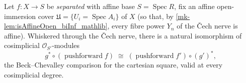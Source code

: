 \begin{lemma}\label{mk-lem:cech_pushforward_baseChange_natIso}
  \leanok

  Let \(f : X \to S\) be \emph{separated} with affine base \(S = \operatorname{Spec} R\),
  fix an affine open-immersion cover \(\mathfrak{U} = \{U_i = \operatorname{Spec} A_i\}\) of
  \(X\) (so that, by \ref{mk-lem:isAffineOpen_biInf_mathlib}, every fibre power \(Y_n\) of the
  {\v C}ech nerve is affine). Whiskered through the {\v C}ech nerve, there is a natural
  isomorphism of cosimplicial \(\mathcal{O}_{S'}\)-modules
  \[
    g^* \circ (\operatorname{pushforward} f) \;\cong\;
      (\operatorname{pushforward} f') \circ (g')^*,
  \]
  the Beck--Chevalley comparison for the cartesian square, valid at every cosimplicial
  degree.
\end{lemma}

